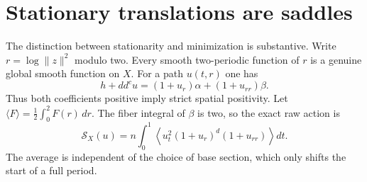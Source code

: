 \documentclass[11pt]{article}
\newcommand{\ddc}{dd^c}
\theoremstyle{remark}\newtheorem{remark}[theorem]{Remark}
\begin{document}
\section{Stationary translations are saddles}
The distinction between stationarity and minimization is substantive.
Write $r=\log\lVert z\rVert^2$ modulo two. Every smooth two-periodic
function of $r$ is a genuine global smooth function on $X$. For a path
$u(t,r)$ one has
\[
 h+\ddc u=(1+u_r)\alpha+(1+u_{rr})\beta .
\]
Thus both coefficients positive imply strict spatial positivity.
Let $\langle F\rangle=\frac12\int_0^2F(r)\,dr$.
The fiber integral of $\beta$ is two, so the exact raw action is
\begin{equation}\label{eq:radial-action}
 \mathcal S_X(u)=n\int_0^1
   \left\langle u_t^2(1+u_r)^d(1+u_{rr})\right\rangle dt.
\end{equation}
The average is independent of the choice of base section, which only
shifts the start of a full period.
\end{document}
